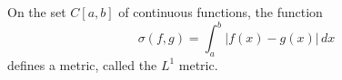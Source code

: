 On the set $C[a,b]$ of continuous functions, the function
$$\sigma(f, g) = \int_a^b |f(x) - g(x)| \, dx$$
defines a metric, called the $L^1$ metric.
